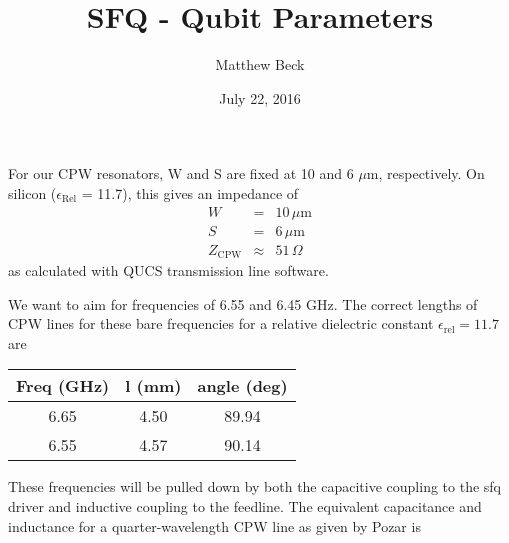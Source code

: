 \documentclass[12pt,reqno]{amsart}
\title{\vspace{-1.7cm}SFQ - Qubit Parameters}
\author{Matthew Beck}
\date{\vspace{-.5cm}July 22, 2016} %
\begin{document}
\maketitle
\setlength{\parindent}{0pt}

\printnomenclature[6cm]
\vspace{1cm}


For our CPW resonators, W and S are fixed at 10 and 6 $\mu$m, respectively. On silicon ($\epsilon_\text{Rel}$ = 11.7), this gives an impedance of 
\begin{eqnarray}
W &=& 10 \, \mu\text{m} \\
S &=& 6 \, \mu\text{m}\\
Z_\text{CPW} &\approx& 51 \, \Omega
\end{eqnarray}
as calculated with QUCS transmission line software.

We want to aim for frequencies of 6.55 and 6.45 GHz. The correct lengths of CPW lines for these bare frequencies for a relative dielectric constant $\epsilon_\text{rel} = 11.7$ are

\begin{table}[h]
\begin{center}
\begin{tabular}{|c|c|c|}
\textbf{Freq (GHz)} 	& \textbf{l (mm)} 	& \textbf{angle (deg)} \\
\hline
6.65			& 4.50	& 89.94 \\
6.55			& 4.57	& 90.14 \\
\end{tabular}
\end{center}
\end{table}%

These frequencies will be pulled down by both the capacitive coupling to the sfq driver and inductive coupling to the feedline. The equivalent capacitance and inductance for a quarter-wavelength CPW line as given by Pozar is
\end{document}
